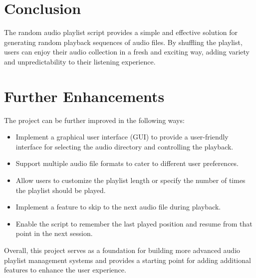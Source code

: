 \documentclass{article}
\begin{document}
\section{Conclusion}
The random audio playlist script provides a simple and effective solution for generating random playback sequences of audio files. By shuffling the playlist, users can enjoy their audio collection in a fresh and exciting way, adding variety and unpredictability to their listening experience.

\section{Further Enhancements}
The project can be further improved in the following ways:

\begin{itemize}
    \item Implement a graphical user interface (GUI) to provide a user-friendly interface for selecting the audio directory and controlling the playback.
    \item Support multiple audio file formats to cater to different user preferences.
    \item Allow users to customize the playlist length or specify the number of times the playlist should be played.
    \item Implement a feature to skip to the next audio file during playback.
    \item Enable the script to remember the last played position and resume from that point in the next session.
\end{itemize}

Overall, this project serves as a foundation for building more advanced audio playlist management systems and provides a starting point for adding additional features to enhance the user experience.
\end{document}
